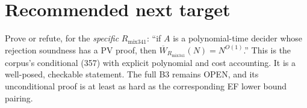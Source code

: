 \documentclass[11pt]{article}
\newcommand{\Wb}{\overline W}
\begin{document}
\section{Recommended next target}
Prove or refute, for the \emph{specific} $R_{\mathrm{mix341}}$: ``if $A$ is a
polynomial-time decider whose rejection soundness has a PV proof, then
$\Wb_{R_{\mathrm{mix341}}}(N)=N^{O(1)}$.'' This is the corpus's conditional (357)
with explicit polynomial and cost accounting. It is a well-posed, checkable statement.
The full B3 remains OPEN, and its unconditional proof is at least as hard as
the corresponding EF lower bound pairing.
\end{document}
